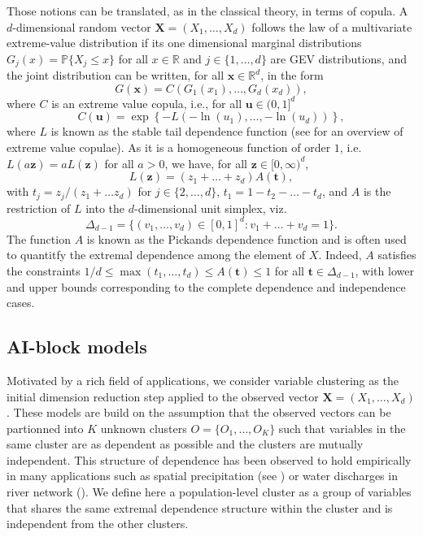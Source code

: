 \documentclass[11pt]{article}
\theoremstyle{definition}
\begin{document}
	Those notions can be translated, as in the classical theory, in terms of copula. A $d$-dimensional random vector $\textbf{X} = (X_1, \dots, X_d)$ follows the law of a multivariate extreme-value distribution if its one dimensional marginal distributions $G_j(x) = \mathbb{P}\{X_j \leq x\}$ for all $x \in \mathbb{R}$ and $j \in \{1,\dots,d\}$ are GEV distributions, and the joint distribution can be written, for all $\textbf{x} \in \mathbb{R}^d$, in the form
	\begin{equation}
	\label{eq:ev_cop}
		G(\textbf{x}) = C\left(G_1(x_1), \dots, G_d(x_d)\right),
	\end{equation}
	where $C$ is an extreme value copula, i.e., for all $\textbf{u} \in (0,1]^d$
	\begin{equation*}
		C(\textbf{u}) = \exp\left\{-L\left(-\ln(u_1), \dots, -\ln(u_d)\right)\right\},
	\end{equation*}
	where $L$ is known as the stable tail dependence function (see \cite{gudendorf2010} for an overview of extreme value copulae). As it is a homogeneous function of order $1$, i.e. $L(a\textbf{z}) = a L(\textbf{z})$ for all $a > 0$, we have, for all $\textbf{z} \in [0,\infty)^d$,
	\begin{equation*}
		L(\textbf{z}) = (z_1 + \dots + z_d)A(\textbf{t}),
	\end{equation*}
	with $t_j = z_j / (z_1 + \dots z_d)$ for $j \in \{2,\dots,d\}$, $t_1 = 1-t_2-\dots-t_d$, and $A$ is the restriction of $L$ into the $d$-dimensional unit simplex, viz.
	\begin{equation*}
		\Delta_{d-1} = \{(v_1, \dots, v_d) \in [0,1]^d : v_1 + \dots + v_d = 1\}.
	\end{equation*}
	The function $A$ is known as the Pickands dependence function and is often used to quantitfy the extremal dependence among the element of $X$. Indeed, $A$ satisfies the constraints $1/d \leq \max(t_1, \dots, t_d) \leq A(\textbf{t}) \leq 1$ for all $\textbf{t} \in \Delta_{d-1}$, with lower and upper bounds corresponding to the complete dependence and independence cases.
	
	\subsection{AI-block models} 
	
	Motivated by a rich field of applications, we consider variable clustering as the initial dimension reduction step applied to the observed vector $\textbf{X} = (X_1, \dots, X_d)$. These models are build on the assumption that the observed vectors can be partionned into $K$ unknown clusters $O = \{O_1, \dots, O_K\}$ such that variables in the same cluster are as dependent as possible and the clusters are mutually independent. This structure of dependence has been observed to hold empirically in many applications such as spatial precipitation (see \cite{lalancette2021rank, le2018dependence}) or water discharges in river network (\cite{fomichov2022spherical}). We define here a population-level cluster as a group of variables that shares the same extremal dependence structure within the cluster and is independent from the other clusters.
	 
\end{document}
